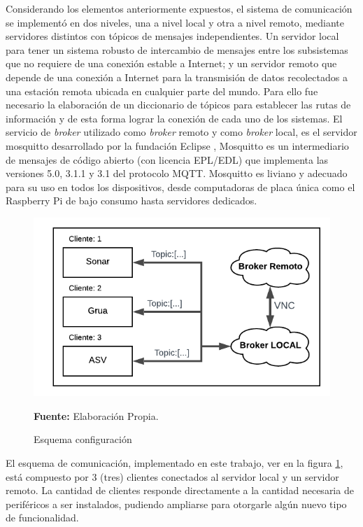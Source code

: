 Considerando los elementos anteriormente expuestos, el sistema de comunicaci\'on 
se implement\'o en dos niveles, una a nivel local y otra a nivel remoto, mediante servidores distintos con t\'opicos de mensajes independientes. 
Un servidor local para tener un sistema robusto de intercambio de mensajes entre los subsistemas que no requiere de una conexi\'on estable a Internet; y un servidor remoto que depende de una conexi\'on a Internet para la transmisi\'on de datos recolectados a una estación remota ubicada en cualquier parte del mundo. 
Para ello fue necesario la elaboraci\'on de un diccionario de t\'opicos para establecer las rutas de informaci\'on y de esta forma lograr la conexi\'on de cada uno de los sistemas.
El servicio de \textit{broker} utilizado como \textit{broker} remoto y como \textit{broker} local, es el servidor mosquitto desarrollado por la fundaci\'on Eclipse \cite{mosquitto_eclipse_2018}, Mosquitto es un intermediario de mensajes de código abierto (con licencia EPL/EDL) que implementa las versiones 5.0, 3.1.1 y 3.1 del protocolo MQTT. Mosquitto es liviano y adecuado para su uso en todos los dispositivos, desde computadoras de placa única como el Raspberry Pi de bajo consumo hasta servidores dedicados.
\begin{figure}[ht]
        \centering
        \includegraphics[scale=0.6]{Imagenes/cap3/esquemaCom.png}
        \caption[ Esquema configuraci\'on mqtt]{Esquema configuraci\'on}\textbf{Fuente:} Elaboración Propia.
        \label{fig:mqttUtil}
    \end{figure}

El esquema de comunicaci\'on, implementado en este trabajo, ver en la figura \ref{fig:mqttUtil}, est\'a compuesto por 3 (tres) clientes conectados al servidor local y un servidor remoto. La cantidad de clientes responde directamente a la cantidad necesaria de perif\'ericos a ser instalados, pudiendo ampliarse para otorgarle alg\'un nuevo tipo de funcionalidad. 

